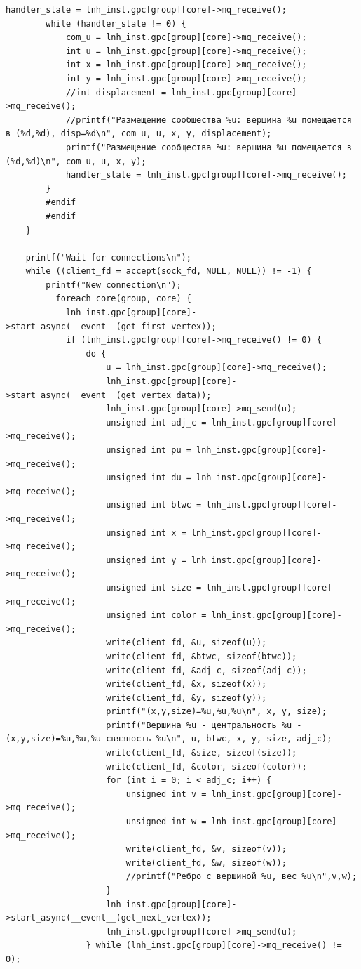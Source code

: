 \begin{lstlisting}[label=code, caption=Код чтения из файла]
		handler_state = lnh_inst.gpc[group][core]->mq_receive();
		while (handler_state != 0) {
			com_u = lnh_inst.gpc[group][core]->mq_receive();
			int u = lnh_inst.gpc[group][core]->mq_receive();
			int x = lnh_inst.gpc[group][core]->mq_receive();
			int y = lnh_inst.gpc[group][core]->mq_receive();
			//int displacement = lnh_inst.gpc[group][core]->mq_receive();
			//printf("Размещение сообщества %u: вершина %u помещается в (%d,%d), disp=%d\n", com_u, u, x, y, displacement);
			printf("Размещение сообщества %u: вершина %u помещается в (%d,%d)\n", com_u, u, x, y);
			handler_state = lnh_inst.gpc[group][core]->mq_receive();
		}
		#endif
		#endif
	}
	
	printf("Wait for connections\n");
	while ((client_fd = accept(sock_fd, NULL, NULL)) != -1) {
		printf("New connection\n");
		__foreach_core(group, core) {
			lnh_inst.gpc[group][core]->start_async(__event__(get_first_vertex));
			if (lnh_inst.gpc[group][core]->mq_receive() != 0) {
				do {
					u = lnh_inst.gpc[group][core]->mq_receive();
					lnh_inst.gpc[group][core]->start_async(__event__(get_vertex_data));
					lnh_inst.gpc[group][core]->mq_send(u);
					unsigned int adj_c = lnh_inst.gpc[group][core]->mq_receive();
					unsigned int pu = lnh_inst.gpc[group][core]->mq_receive();
					unsigned int du = lnh_inst.gpc[group][core]->mq_receive();
					unsigned int btwc = lnh_inst.gpc[group][core]->mq_receive();
					unsigned int x = lnh_inst.gpc[group][core]->mq_receive();
					unsigned int y = lnh_inst.gpc[group][core]->mq_receive();
					unsigned int size = lnh_inst.gpc[group][core]->mq_receive();
					unsigned int color = lnh_inst.gpc[group][core]->mq_receive();
					write(client_fd, &u, sizeof(u));
					write(client_fd, &btwc, sizeof(btwc));
					write(client_fd, &adj_c, sizeof(adj_c));
					write(client_fd, &x, sizeof(x));
					write(client_fd, &y, sizeof(y));
					printf("(x,y,size)=%u,%u,%u\n", x, y, size);
					printf("Вершина %u - центральность %u - (x,y,size)=%u,%u,%u связность %u\n", u, btwc, x, y, size, adj_c);
					write(client_fd, &size, sizeof(size));
					write(client_fd, &color, sizeof(color));
					for (int i = 0; i < adj_c; i++) {
						unsigned int v = lnh_inst.gpc[group][core]->mq_receive();
						unsigned int w = lnh_inst.gpc[group][core]->mq_receive();
						write(client_fd, &v, sizeof(v));
						write(client_fd, &w, sizeof(w));
						//printf("Ребро с вершиной %u, вес %u\n",v,w);
					}
					lnh_inst.gpc[group][core]->start_async(__event__(get_next_vertex));
					lnh_inst.gpc[group][core]->mq_send(u);
				} while (lnh_inst.gpc[group][core]->mq_receive() != 0);
				

\end{lstlisting}
